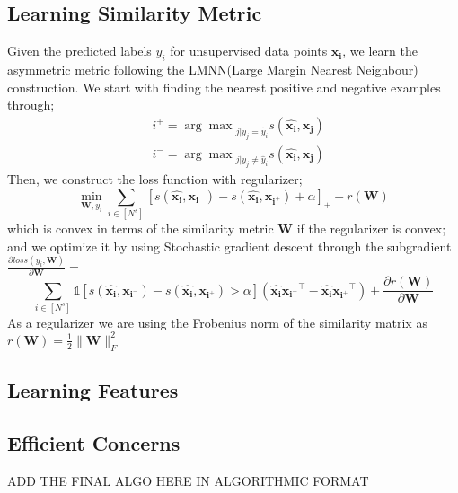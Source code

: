 \subsection{Learning Similarity Metric}
Given the predicted labels $y_i$ for unsupervised data points $\mathbf{x_i}$, we learn the asymmetric metric following the LMNN(Large Margin Nearest Neighbour)\cite{lmnn} construction. We start with finding the nearest positive and negative examples through;
\begin{equation}
\begin{aligned}
&i^{+} = {\arg\max}_{j | y_j = \hat{y}_i} s(\mathbf{\hat{x_i}},\mathbf{x_{j}}) \\
&i^{-} = {\arg\max}_{j | y_j \neq \hat{y}_i} s(\mathbf{\hat{x_i}},\mathbf{x_{j}}) 
\end{aligned}
\end{equation}
Then, we construct the loss function with regularizer;
\begin{equation}
\min_{\mathbf{W}, y_i} \sum_{i \in [N^s]} [s(\mathbf{\hat{x_i}},\mathbf{x_{i^-}}) - s(\mathbf{\hat{x_i}},\mathbf{x_{i^+}}) + \alpha]_{+} + r(\mathbf{W})
\end{equation}
which is convex in terms of the similarity metric $\mathbf{W}$ if the regularizer is convex; and we optimize it by using Stochastic gradient descent through the subgradient $\frac{\partial loss (y_i, \mathbf{W})}{\partial \mathbf{W}} =$
\begin{equation}
\sum_{i \in [N^s]} \mathds{1}[s(\mathbf{\hat{x_i}},\mathbf{x_{i^-}}) - s(\mathbf{\hat{x_i}},\mathbf{x_{i^+}}) > \alpha] \left( \mathbf{\hat{x_i}}\mathbf{x_{i^-}}^\intercal - \mathbf{\hat{x_i}}\mathbf{x_{i^+}}^\intercal  \right)  + \frac{\partial r ( \mathbf{W})}{\partial \mathbf{W}}
\end{equation}
As a regularizer we are using the Frobenius norm of the similarity matrix as $r(\mathbf{W})=\frac{1}{2}\|\mathbf{W}\|_F^2$ 

\subsection{Learning Features}
\subsection{Efficient Concerns}

ADD THE FINAL ALGO HERE IN ALGORITHMIC FORMAT